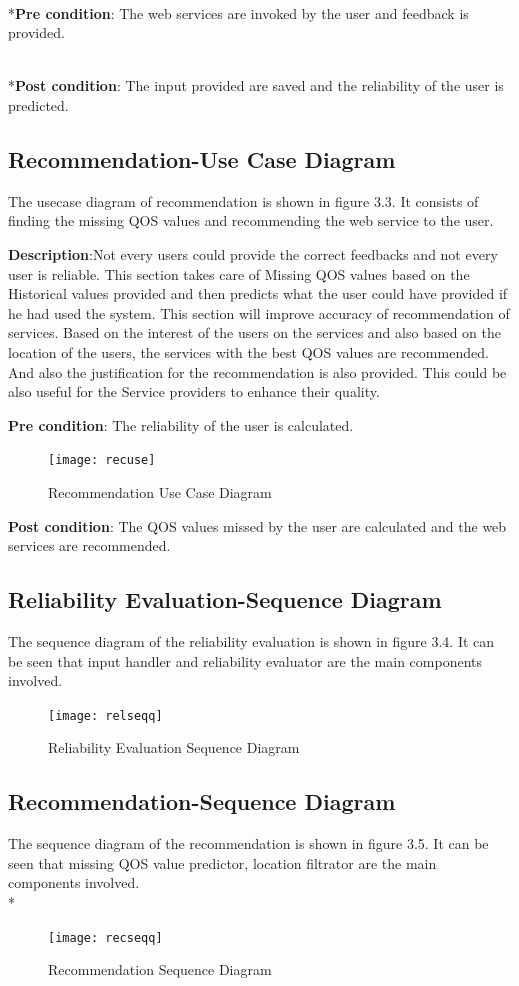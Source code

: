 \\*\textbf{Pre condition}: The web services are invoked by the user and feedback is provided.

\\*\textbf{Post condition}: The input provided are saved and the reliability of the user is predicted. 

\bigskip
\subsection{Recommendation-Use Case Diagram }
 The usecase diagram of recommendation is shown in figure 3.3. It consists of finding the missing QOS values and recommending the web service to the user.

\bigskip
\textbf{Description}:Not every users could provide the correct feedbacks and not every user is reliable. This section takes care of Missing QOS values based on the Historical values provided and then predicts what  the user could have provided if he had used the system. This section will improve accuracy of recommendation of services. Based on the interest of the users on the services and also based on the location of the users, the services with the best QOS values are recommended. And also the justification for the recommendation is also  provided. This could be also useful for the Service providers to enhance their quality.

\linebreak
\textbf{Pre condition}: The reliability of the user is calculated.

\linebreak
\begin{figure}[h!]
\centering
\texttt{[image: recuse]}
\caption{Recommendation Use Case Diagram}
\label{fig:universe}
\end{figure}
\textbf{Post condition}: The QOS values missed by the user are calculated and the web services are recommended. 
\subsection{Reliability Evaluation-Sequence Diagram}
 The sequence diagram of the reliability evaluation is shown in figure 3.4. It can be seen that input handler and reliability evaluator are the main components involved.

\begin{figure}[h!]
\centering
\texttt{[image: relseqq]}
\caption{Reliability Evaluation Sequence Diagram}
\label{fig:universe}
\end{figure}
\linebreak
\subsection{Recommendation-Sequence Diagram}
 The sequence diagram of the recommendation is shown in figure 3.5. It can be seen that missing QOS value predictor, location filtrator are the main components involved.
 \\*
\begin{figure}[h!]
\centering
\texttt{[image: recseqq]}
\caption{Recommendation Sequence Diagram}
\label{fig:universe}
\end{figure}
